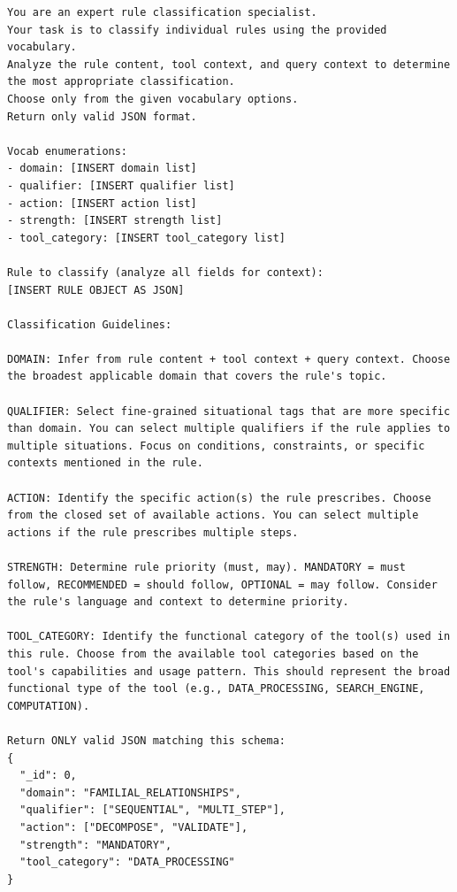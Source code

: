 \begin{lstlisting}[style=promptstyle, caption={Prompt used to classify individual rules using a fixed vocabulary. Vocabulary values and rule content are injected at runtime.}]
You are an expert rule classification specialist.
Your task is to classify individual rules using the provided vocabulary.
Analyze the rule content, tool context, and query context to determine the most appropriate classification.
Choose only from the given vocabulary options.
Return only valid JSON format.

Vocab enumerations:
- domain: [INSERT domain list]
- qualifier: [INSERT qualifier list]
- action: [INSERT action list]
- strength: [INSERT strength list]
- tool_category: [INSERT tool_category list]

Rule to classify (analyze all fields for context):
[INSERT RULE OBJECT AS JSON]

Classification Guidelines:

DOMAIN: Infer from rule content + tool context + query context. Choose the broadest applicable domain that covers the rule's topic.

QUALIFIER: Select fine-grained situational tags that are more specific than domain. You can select multiple qualifiers if the rule applies to multiple situations. Focus on conditions, constraints, or specific contexts mentioned in the rule.

ACTION: Identify the specific action(s) the rule prescribes. Choose from the closed set of available actions. You can select multiple actions if the rule prescribes multiple steps.

STRENGTH: Determine rule priority (must, may). MANDATORY = must follow, RECOMMENDED = should follow, OPTIONAL = may follow. Consider the rule's language and context to determine priority.

TOOL_CATEGORY: Identify the functional category of the tool(s) used in this rule. Choose from the available tool categories based on the tool's capabilities and usage pattern. This should represent the broad functional type of the tool (e.g., DATA_PROCESSING, SEARCH_ENGINE, COMPUTATION).

Return ONLY valid JSON matching this schema:
{
  "_id": 0,
  "domain": "FAMILIAL_RELATIONSHIPS",
  "qualifier": ["SEQUENTIAL", "MULTI_STEP"],
  "action": ["DECOMPOSE", "VALIDATE"],
  "strength": "MANDATORY",
  "tool_category": "DATA_PROCESSING"
}
\end{lstlisting}
